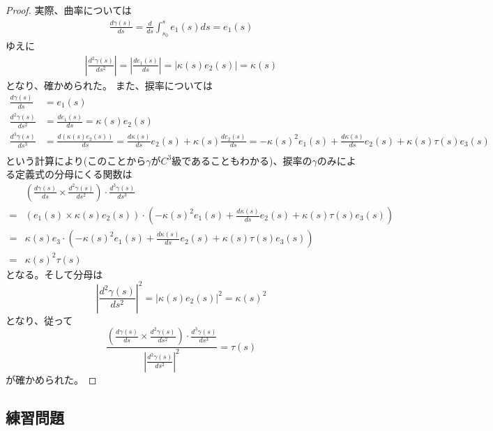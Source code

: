\begin{proof}
  実際、曲率については
  \begin{align*}
    \frac{d\gamma(s)}{ds}=\frac{d}{ds}\int_{s_0}^se_1(s)ds=e_1(s)
  \end{align*}
  ゆえに
  \begin{align*}
    \left|\frac{d^2\gamma(s)}{ds^2}\right|=\left|\frac{de_1(s)}{ds}\right|=\left|\kappa(s)e_2(s)\right|=\kappa(s)
  \end{align*}
  となり、確かめられた。
  また、捩率については
  \begin{align*}
    \frac{d\gamma(s)}{ds}&=e_1(s)\\
    \frac{d^2\gamma(s)}{ds^2}&=\frac{de_1(s)}{ds}=\kappa(s)e_2(s)\\
    \frac{d^3\gamma(s)}{ds^3}&=\frac{d(\kappa(s)e_2(s))}{ds}=\frac{d\kappa(s)}{ds}e_2(s)+\kappa(s)\frac{de_2(s)}{ds}=-\kappa(s)^2e_1(s)+\frac{d\kappa(s)}{ds}e_2(s)+\kappa(s)\tau(s)e_3(s)\\
  \end{align*}
  という計算により(このことから$\gamma$が$C^3$級であることもわかる)、捩率の$\gamma$のみによる定義式の分母にくる関数は
  \begin{align*}
    &\left(\frac{d\gamma(s)}{ds}\times\frac{d^2\gamma(s)}{ds^2}\right)\cdot\frac{d^3\gamma(s)}{ds^3}\\
    =&(e_1(s)\times\kappa(s)e_2(s))\cdot\left(-\kappa(s)^2e_1(s)+\frac{d\kappa(s)}{ds}e_2(s)+\kappa(s)\tau(s)e_3(s)\right)\\
    =&\kappa(s)e_3\cdot\left(-\kappa(s)^2e_1(s)+\frac{d\kappa(s)}{ds}e_2(s)+\kappa(s)\tau(s)e_3(s)\right)\\
    =&\kappa(s)^2\tau(s)
  \end{align*}
  となる。そして分母は
  \[
    \left|\frac{d^2\gamma(s)}{ds^2}\right|^2=\left|\kappa(s)e_2(s)\right|^2=\kappa(s)^2
  \]
  となり、従って
  \[
    \frac{\left(\frac{d\gamma(s)}{ds}\times\frac{d^2\gamma(s)}{ds^2}\right)\cdot\frac{d^3\gamma(s)}{ds^3}}{\left|\frac{d^2\gamma(s)}{ds^2}\right|^2}=\tau(s)
  \]
  が確かめられた。
\end{proof}

\subsection{練習問題}

